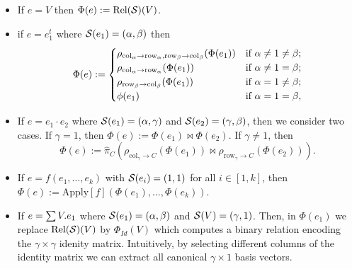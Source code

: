 \begin{itemize}
	\item If $e=V$ then $\Phi(e):=\text{Rel}(\mathcal{S})(V)$.
	\item if $e=e_1^t$ where $\mathcal{S}(e_1)=(\alpha,\beta)$ then \[
\Phi(e) :=
\begin{cases}
\rho_{\mathrm{col}_\alpha \to \mathrm{row}_\alpha,\mathrm{row}_\beta \to \mathrm{col}_\beta}(\Phi(e_1)) & \text{if } \alpha \neq 1 \neq \beta; \cr
\rho_{\mathrm{col}_\alpha \to \mathrm{row}_\alpha}(\Phi(e_1)) & \text{if } \alpha \neq 1 = \beta; \cr
\rho_{\mathrm{row}_\beta \to \mathrm{col}_\beta}(\Phi(e_1)) & \text{if } \alpha = 1 \neq \beta; \cr
\phi(e_1) & \text{if } \alpha = 1 = \beta,
\end{cases}
\]
\item
	If $e = e_1 \cdot e_2$ where $\mathcal{S}(e_1) = (\alpha,\gamma)$ and $\mathcal{S}(e_2) =(\gamma,\beta)$, then we consider two cases. If $\gamma = 1$, then $\Phi(e) := \Phi(e_1) \Join \Phi(e_2)$. If $\gamma \neq 1$, then 
	$$
	\Phi(e) := \hat{\pi}_C(\rho_{\mathrm{col}_\gamma\to C}(\Phi(e_1))\Join\rho_{\mathrm{row}_\gamma\to C}(\Phi(e_2))).$$
	\item If $e=f(e_1,\ldots,e_k)$ with $\mathcal{S}(e_i)=(1,1)$ for all $i\in[1,k]$, then
	$\Phi(e):=\text{Apply}[f](\Phi(e_1),\ldots,\Phi(e_k))$. 
	\item If $e=\textstyle\sum V.e_1$ where $\mathcal{S}(e_1)=(\alpha,\beta)$ and $\mathcal{S}(V)=(\gamma,1)$. Then,
	in $\Phi(e_1)$ we replace $\text{Rel}(\mathcal{S})(V)$ by $\Phi_{Id}(V)$ which computes a binary 
	relation encoding the $\gamma\times\gamma$ idenity matrix. Intuitively, by selecting different
	columns of the identity matrix we can extract all canonical $\gamma\times 1$ basis vectors.

\end{itemize}

